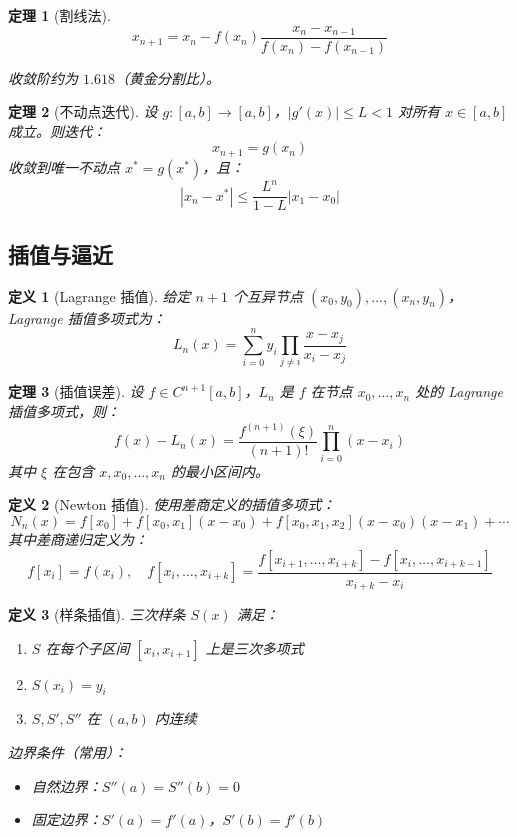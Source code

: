 \documentclass[12pt]{article}
\newtheorem{theorem}{定理}[section]
\newtheorem{definition}{定义}[section]
\begin{document}
\begin{theorem}[割线法]
$$x_{n+1} = x_n - f(x_n) \frac{x_n - x_{n-1}}{f(x_n) - f(x_{n-1})}$$

收敛阶约为 $1.618$（黄金分割比）。
\end{theorem}

\begin{theorem}[不动点迭代]
设 $g: [a, b] \to [a, b]$，$|g'(x)| \leq L < 1$ 对所有 $x \in [a, b]$ 成立。则迭代：
$$x_{n+1} = g(x_n)$$
收敛到唯一不动点 $x^* = g(x^*)$，且：
$$|x_n - x^*| \leq \frac{L^n}{1 - L}|x_1 - x_0|$$
\end{theorem}

\subsection{插值与逼近}

\begin{definition}[Lagrange 插值]
给定 $n+1$ 个互异节点 $(x_0, y_0), \ldots, (x_n, y_n)$，Lagrange 插值多项式为：
$$L_n(x) = \sum_{i=0}^{n} y_i \prod_{j \neq i} \frac{x - x_j}{x_i - x_j}$$
\end{definition}

\begin{theorem}[插值误差]
设 $f \in C^{n+1}[a, b]$，$L_n$ 是 $f$ 在节点 $x_0, \ldots, x_n$ 处的 Lagrange 插值多项式，则：
$$f(x) - L_n(x) = \frac{f^{(n+1)}(\xi)}{(n+1)!} \prod_{i=0}^{n} (x - x_i)$$
其中 $\xi$ 在包含 $x, x_0, \ldots, x_n$ 的最小区间内。
\end{theorem}

\begin{definition}[Newton 插值]
使用差商定义的插值多项式：
$$N_n(x) = f[x_0] + f[x_0, x_1](x - x_0) + f[x_0, x_1, x_2](x - x_0)(x - x_1) + \cdots$$
其中差商递归定义为：
$$f[x_i] = f(x_i), \quad f[x_i, \ldots, x_{i+k}] = \frac{f[x_{i+1}, \ldots, x_{i+k}] - f[x_i, \ldots, x_{i+k-1}]}{x_{i+k} - x_i}$$
\end{definition}

\begin{definition}[样条插值]
三次样条 $S(x)$ 满足：
\begin{enumerate}
\item $S$ 在每个子区间 $[x_i, x_{i+1}]$ 上是三次多项式
\item $S(x_i) = y_i$
\item $S, S', S''$ 在 $(a, b)$ 内连续
\end{enumerate}

边界条件（常用）：
\begin{itemize}
\item 自然边界：$S''(a) = S''(b) = 0$
\item 固定边界：$S'(a) = f'(a)$，$S'(b) = f'(b)$
\end{itemize}
\end{definition}
\end{document}
